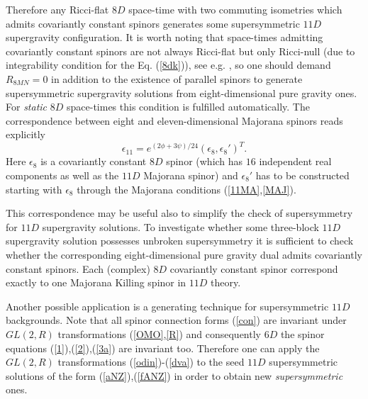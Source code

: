 \documentclass[a4paper,12pt]{article}
\begin{document}
Therefore any Ricci-flat $8D$ space-time with two commuting
isometries which admits covariantly constant spinors generates
some supersymmetric $11D$ supergravity configuration. It is
worth noting that space-times admitting covariantly constant
spinors are not always Ricci-flat but only Ricci-null (due to
integrability condition for the Eq. (\ref{8dk})), see e.g.
\cite{Fig99}, so one should demand $R_{8MN}=0$ in addition to
the existence of parallel spinors to generate supersymmetric
supergravity solutions from eight-dimensional pure gravity
ones. For {\it static} $8D$ space-times this condition is
fulfilled automatically. The correspondence between eight and
eleven-dimensional Majorana spinors reads explicitly
\begin{equation}\label{expr}
\epsilon_{11} = e^{(2\phi+3\psi)/24} (\epsilon_8,\epsilon_8')^T.
\end{equation}
Here $\epsilon_8$ is a covariantly constant $8D$ spinor (which
has $16$ independent real components as well as the $11D$
Majorana spinor) and $\epsilon_8'$ has to be constructed starting
with $\epsilon_8$ through the Majorana conditions
(\ref{11MA},\ref{MAJ}).

This correspondence may be useful also to simplify the check of
supersymmetry for $11D$ supergravity solutions. To investigate
whether some three-block $11D$ supergravity solution possesses
unbroken supersymmetry it is sufficient to check whether the
corresponding eight-dimensional pure gravity dual admits
covariantly constant spinors. Each (complex) $8D$ covariantly
constant spinor correspond exactly to one Majorana Killing
spinor in $11D$ theory.

Another possible application is a generating technique for
supersymmetric $11D$ backgrounds. Note that all spinor connection
forms (\ref{con}) are invariant under $GL(2,R)$ transformations
(\ref{OMO},\ref{R}) and consequently $6D$ the spinor equations
(\ref{1}),(\ref{2}),(\ref{3a}) are invariant too. Therefore one
can apply the $GL(2,R)$ transformations (\ref{odin})-(\ref{dva})
to the seed $11D$ supersymmetric solutions of the form
(\ref{aNZ}),(\ref{fANZ}) in order to obtain new {\it
supersymmetric} ones.


\end{document}
